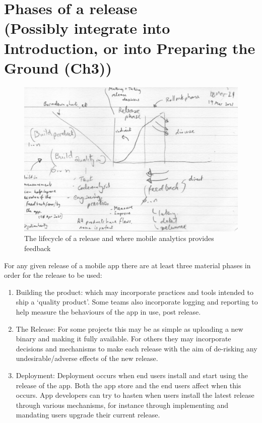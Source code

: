 \clearpage
\section[Phases of a release]{Phases of a release\\ \small{(Possibly integrate into Introduction, or into Preparing the Ground (Ch3))}}


\begin{figure}
    \centering
    \includegraphics[width=15cm]{images/rough-sketches/Red-Thread-Rough-Sketch.jpeg}
    \caption{The lifecycle of a release and where mobile analytics provides feedback}
    \label{fig:red-thread-for-this-thesis}
\end{figure}

For any given release of a mobile app there are at least three material phases in order for the release to be used:
\begin{enumerate}
    \item Building the product: which may incorporate practices and tools intended to ship a `quality product'. Some teams also incorporate logging and reporting to help measure the behaviours of the app in use, post release.
    \item The Release: For some projects this may be as simple as uploading a new binary and making it fully available. For others they may incorporate decisions and mechanisms to make each release with the aim of de-risking any undesirable/adverse effects of the new release.
    \item Deployment: Deployment occurs when end users install and start using the release of the app. Both the app store and the end users affect when this occurs. App developers can try to hasten when users install the latest release through various mechanisms, for instance through implementing and mandating users upgrade their current release.
\end{enumerate}

